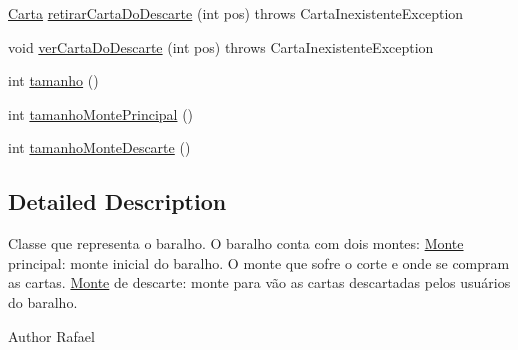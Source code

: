 \begin{DoxyCompactItemize}
\hyperlink{class_baralho_1_1_carta}{\-Carta} \hyperlink{class_baralho_1_1_baralho_ad6ceed72b137e5bf5490af7dcd282648}{retirar\-Carta\-Do\-Descarte} (int pos)  throws Carta\-Inexistente\-Exception 
\item 
void \hyperlink{class_baralho_1_1_baralho_a9a20256555c03889f244ce40957ae7f8}{ver\-Carta\-Do\-Descarte} (int pos)  throws Carta\-Inexistente\-Exception 
\item 
int \hyperlink{class_baralho_1_1_baralho_ac382a9e91f65da63c8e3fac26eba6225}{tamanho} ()
\item 
int \hyperlink{class_baralho_1_1_baralho_aace43f8f3dbbca74e2e2b5083ec3f305}{tamanho\-Monte\-Principal} ()
\item 
int \hyperlink{class_baralho_1_1_baralho_a2c293b134d1b685b19e46376097c02b8}{tamanho\-Monte\-Descarte} ()
\end{DoxyCompactItemize}


\subsection{\-Detailed \-Description}
\-Classe que representa o baralho. \-O baralho conta com dois montes\-: \hyperlink{class_baralho_1_1_monte}{\-Monte} principal\-: monte inicial do baralho. \-O monte que sofre o corte e onde se compram as cartas. \hyperlink{class_baralho_1_1_monte}{\-Monte} de descarte\-: monte para vão as cartas descartadas pelos usuários do baralho. \begin{DoxyAuthor}{\-Author}
\-Rafael 
\end{DoxyAuthor}


